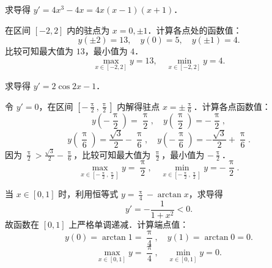 \begin{solution}

    求导得 $y' = 4x^3 - 4x = 4x(x - 1)(x + 1)$．

    在区间 $[-2, 2]$ 内的驻点为 $x = 0, \pm 1$．计算各点处的函数值：
    \begin{equation}
        y(\pm 2) = 13, \quad y(0) = 5, \quad y(\pm 1) = 4.
    \end{equation}
    比较可知最大值为 $13$，最小值为 $4$．
    \begin{equation}
        \boxed{\max_{x\in[-2, 2]} y = 13, \quad \min_{x\in[-2, 2]} y = 4.}
    \end{equation}


    求导得 $y' = 2\cos 2x - 1$．

    令 $y' = 0$，在区间 $\left[-\frac{\uppi}{2}, \frac{\uppi}{2}\right]$ 内解得驻点 $x = \pm \frac{\uppi}{6}$．计算各点函数值：
    \begin{equation}
        y\left(-\frac{\uppi}{2}\right) = \frac{\uppi}{2}, \quad y\left(\frac{\uppi}{2}\right) = -\frac{\uppi}{2},
    \end{equation}
    \begin{equation}
        y\left(\frac{\uppi}{6}\right) = \frac{\sqrt{3}}{2} - \frac{\uppi}{6}, \quad y\left(-\frac{\uppi}{6}\right) = -\frac{\sqrt{3}}{2} + \frac{\uppi}{6}.
    \end{equation}
    因为 $\frac{\uppi}{2} > \frac{\sqrt{3}}{2} - \frac{\uppi}{6}$，比较可知最大值为 $\frac{\uppi}{2}$，最小值为 $-\frac{\uppi}{2}$．
    \begin{equation}
        \boxed{\max_{x\in\left[-\frac{\uppi}{2}, \frac{\uppi}{2}\right]} y = \frac{\uppi}{2}, \quad \min_{x\in\left[-\frac{\uppi}{2}, \frac{\uppi}{2}\right]} y = -\frac{\uppi}{2}.}
    \end{equation}


    当 $x \in [0, 1]$ 时，利用恒等式 $y = \frac{\uppi}{4} - \arctan x$，求导得
    \begin{equation}
        y' = -\frac{1}{1 + x^2} < 0.
    \end{equation}
    故函数在 $[0, 1]$ 上严格单调递减．计算端点值：
    \begin{equation}
        y(0) = \arctan 1 = \frac{\uppi}{4}, \quad y(1) = \arctan 0 = 0.
    \end{equation}
    \begin{equation}
        \boxed{\max_{x\in[0, 1]} y = \frac{\uppi}{4}, \quad \min_{x\in[0, 1]} y = 0.}
    \end{equation}


\end{solution}

